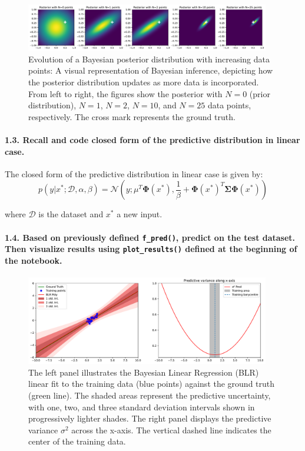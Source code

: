 \begin{figure}[H]
    \centering
    \includegraphics[width=0.95\textwidth]{posterior.pdf}
    \caption{Evolution of a Bayesian posterior distribution with increasing data points: A visual representation of Bayesian inference, depicting how the posterior distribution updates as more data is incorporated. From left to right, the figures show the posterior with $N=0$ (prior distribution), $N=1$, $N=2$, $N=10$, and $N=25$ data points, respectively. The cross mark represents the ground truth.}
    \label{fig:posterior}
\end{figure}

\paragraph*{1.3. Recall and code closed form of the predictive distribution in linear case.}

The closed form of the predictive distribution in linear case is given by:
\[
    p\left(y|x^*; \mathcal{D}, \alpha, \beta\right) = \mathcal{N}\left(y; \mu^T \boldsymbol{\Phi}(x^*), \frac{1}{\beta} + \boldsymbol{\Phi}(x^*)^T \boldsymbol{\Sigma} \boldsymbol{\Phi}(x^*)\right)
\]

where $\mathcal{D}$ is the dataset and $x^*$ a new input.

\paragraph*{1.4. Based on previously defined \texttt{f\_pred()}, predict on the test dataset. Then visualize results using \texttt{plot\_results()} defined at the beginning of the notebook.}

\begin{figure}[!htpb]
    \centering
    \includegraphics[width=0.95\textwidth]{phi_linear.pdf}
    \caption{The left panel illustrates the Bayesian Linear Regression (BLR) linear fit to the training data (blue points) against the ground truth (green line). The shaded areas represent the predictive uncertainty, with one, two, and three standard deviation intervals shown in progressively lighter shades. The right panel displays the predictive variance $\sigma^2$ across the x-axis. The vertical dashed line indicates the center of the training data.}
    \label{fig:phi_linear}
\end{figure}

